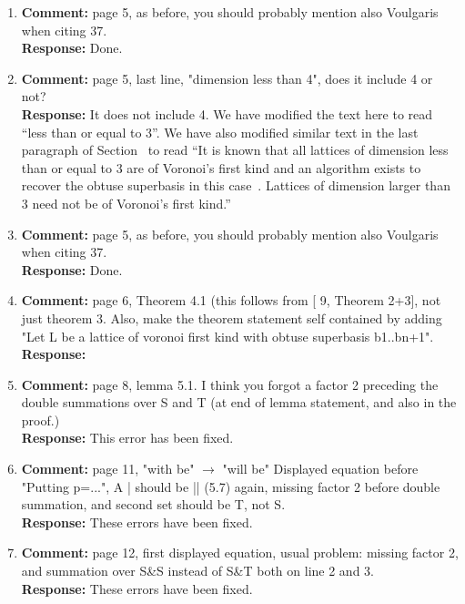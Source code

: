 \documentclass[a4paper,10pt]{article}
\begin{document}
\begin{enumerate}
\item\textbf{Comment:}  
page 5, as before, you should probably mention also Voulgaris when citing 37. 
\\\textbf{Response:}
Done.

\item\textbf{Comment:}  
page 5, last line, "dimension less than 4", does it include 4 or not? 
\\\textbf{Response:}
It does not include 4.  We have modified the text here to read ``less than or equal to $3$''. We have also modified similar text in the last paragraph of Section~ to read ``It is known that all lattices of dimension less than or equal to 3 are of Voronoi's first kind and an algorithm exists to recover the obtuse superbasis in this case~\cite{SPLAG}.  Lattices of dimension larger than 3 need not be of Voronoi's first kind.''

\item\textbf{Comment:}  
page 5, as before, you should probably mention also Voulgaris when citing 37. 
\\\textbf{Response:}
Done.

\item\textbf{Comment:}  
page 6, Theorem 4.1 (this follows from [ 9, Theorem 2+3], not just theorem 3. 
Also, make the theorem statement self contained by adding "Let L be a lattice of voronoi first kind with obtuse superbasis b1..bn+1". 
\\\textbf{Response:}

\item\textbf{Comment:}  
page 8, lemma 5.1. I think you forgot a factor 2 preceding the double summations over S and T (at end of lemma statement, and also in the proof.) 
\\\textbf{Response:}
This error has been fixed.

\item\textbf{Comment:}  
page 11, "with be" $\to$ "will be" Displayed equation before "Putting p=...", A | should be || (5.7) again, missing factor 2 before double summation, and second set should be T, not S. 
\\\textbf{Response:}
These errors have been fixed.

\item\textbf{Comment:}  
page 12, first displayed equation, usual problem: missing factor 2, and summation over S\&S instead of S\&T both on line 2 and 3. 
\\\textbf{Response:}
These errors have been fixed.


\end{enumerate}
\end{document}
